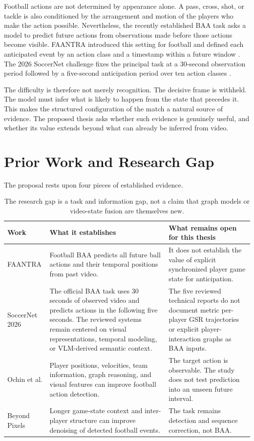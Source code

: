 \documentclass[11pt,a4paper]{article}
\begin{document}
Football actions are not determined by appearance alone. A pass, cross, shot, or tackle is also conditioned by the arrangement and motion of the players who make the action possible. Nevertheless, the recently established BAA task asks a model to predict future actions from observations made before those actions become visible. FAANTRA introduced this setting for football and defined each anticipated event by an action class and a timestamp within a future window \cite{dalal2025faantra}. The 2026 SoccerNet challenge fixes the principal task at a 30-second observation period followed by a five-second anticipation period over ten action classes \cite{cioppa2026}.

The difficulty is therefore not merely recognition. The decisive frame is withheld. The model must infer what is likely to happen from the state that precedes it. This makes the structured configuration of the match a natural source of evidence. The proposed thesis asks whether such evidence is genuinely useful, and whether its value extends beyond what can already be inferred from video.

\section{Prior Work and Research Gap}

The proposal rests upon four pieces of established evidence.

\begin{table}[H]
\centering
\small
\begin{tabularx}{\textwidth}{>{\RaggedRight\arraybackslash}p{2.55cm} X X}
\toprule
\textbf{Work} & \textbf{What it establishes} & \textbf{What remains open for this thesis}\\
\midrule
FAANTRA \cite{dalal2025faantra} & Football BAA predicts all future ball actions and their temporal positions from past video. & It does not establish the value of explicit synchronized player game state for anticipation.\\
SoccerNet 2026 \cite{cioppa2026} & The official BAA task uses 30 seconds of observed video and predicts actions in the following five seconds. The reviewed systems remain centered on visual representations, temporal modeling, or VLM-derived semantic context. & The five reviewed technical reports do not document metric per-player GSR trajectories or explicit player-interaction graphs as BAA inputs.\\
Ochin et al. \cite{ochin2025gs} & Player positions, velocities, team information, graph reasoning, and visual features can improve football action detection. & The target action is observable. The study does not test prediction into an unseen future interval.\\
Beyond Pixels \cite{ochin2025beyond} & Longer game-state context and inter-player structure can improve denoising of detected football events. & The task remains detection and sequence correction, not BAA.\\
\bottomrule
\end{tabularx}
\caption{The research gap is a task and information gap, not a claim that graph models or video-state fusion are themselves new.}
\end{table}
\end{document}

